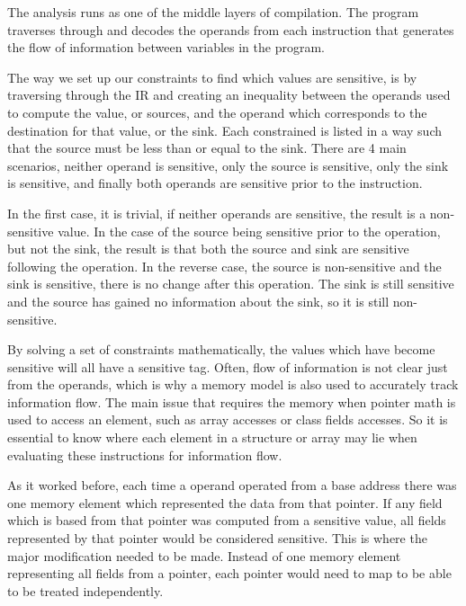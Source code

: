 \documentclass[11pt,a4paper]{article}
\begin{document}
  The analysis runs as one of the middle layers of compilation. The program
  traverses through and decodes the operands from each instruction that
  generates the flow of information between variables in the program.

  The way we set up our constraints to find which values are sensitive, is by
  traversing through the IR and creating an inequality between the operands used
  to compute the value, or sources, and the operand which corresponds to the
  destination for that value, or the sink. Each constrained is listed in a way
  such that the source must be less than or equal to the sink. There are 4 main
  scenarios, neither operand is sensitive, only the source is sensitive, only
  the sink is sensitive, and finally both operands are sensitive prior to the
  instruction.

  In the first case, it is trivial, if neither operands are sensitive, the
  result is a non-sensitive value. In the case of the source being sensitive
  prior to the operation, but not the sink, the result is that both the source
  and sink are sensitive following the operation. In the reverse case, the
  source is non-sensitive and the sink is sensitive, there is no change after
  this operation. The sink is still sensitive and the source has gained no
  information about the sink, so it is still non-sensitive.

  By solving a set of constraints mathematically, the values which have become
  sensitive will all have a sensitive tag. Often, flow of information is not
  clear just from the operands, which is why a memory model is also used to
  accurately track information flow. The main issue that requires the memory
  when pointer math is used to access an element, such as array accesses or
  class fields accesses. So it is essential to know where each element in a
  structure or array may lie when evaluating these instructions for information
  flow.

  As it worked before, each time a operand operated from a base address
  there was one memory element which represented the data from that pointer. If
  any field which is based from that pointer was computed from a sensitive
  value, all fields represented by that pointer would be considered sensitive.
  This is where the major modification needed to be made. Instead of one memory
  element representing all fields from a pointer, each pointer would need to map
  to be able to be treated independently.
\end{document}
